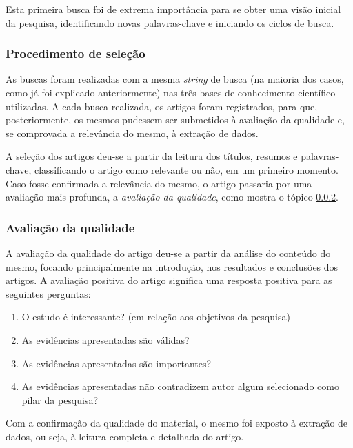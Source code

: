 		Esta primeira busca foi de extrema importância para se obter uma visão inicial da pesquisa, identificando novas palavras-chave e iniciando os ciclos de busca.



		\subsubsection{Procedimento de seleção}

			As buscas foram realizadas com a mesma \textit{string} de busca (na maioria dos casos, como já foi explicado anteriormente) nas três bases de conhecimento científico utilizadas. A cada busca realizada, os artigos foram registrados, para que, posteriormente, os mesmos pudessem ser submetidos à avaliação da qualidade e, se comprovada a relevância do mesmo, à extração de dados.

			A seleção dos artigos deu-se a partir da leitura dos títulos, resumos e palavras-chave, classificando o artigo como relevante ou não, em um primeiro momento. Caso fosse confirmada a relevância do mesmo, o artigo passaria por uma avaliação mais profunda, a \textit{avaliação da qualidade}, como mostra o tópico \ref{sub:avaliacao_qualidade}.


		\subsubsection{Avaliação da qualidade}
		\label{sub:avaliacao_qualidade}

			A avaliação da qualidade do artigo deu-se a partir da análise do conteúdo do mesmo, focando principalmente na introdução, nos resultados e conclusões dos artigos. A avaliação positiva do artigo significa uma resposta positiva para as seguintes perguntas:

			\begin{enumerate}
				\item O estudo é interessante? (em relação aos objetivos da pesquisa)
				\item As evidências apresentadas são válidas?
				\item As evidências apresentadas são importantes?
				\item As evidências apresentadas não contradizem autor algum selecionado como pilar da pesquisa?
			\end{enumerate}

			Com a confirmação da qualidade do material, o mesmo foi exposto à extração de dados, ou seja, à leitura completa e detalhada do artigo.

